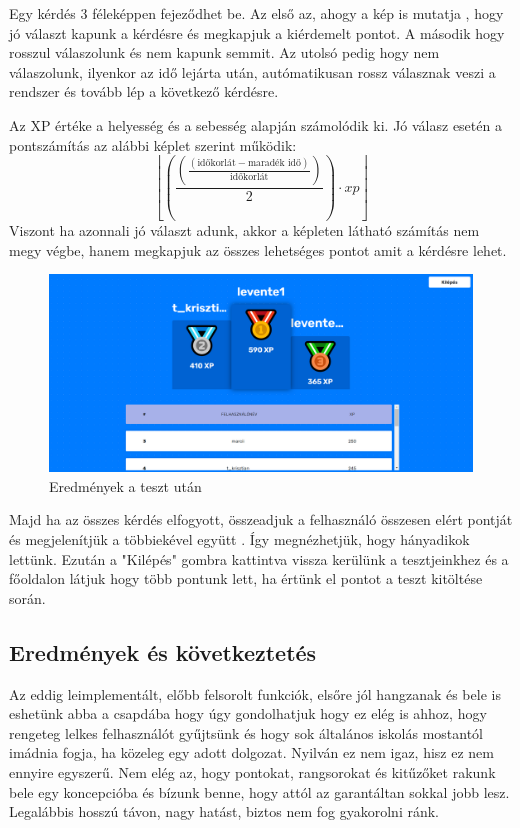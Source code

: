 Egy kérdés 3 féleképpen fejeződhet be. Az első az, ahogy a kép is mutatja , hogy jó választ kapunk a kérdésre és megkapjuk a kiérdemelt pontot. A második hogy rosszul válaszolunk és nem kapunk semmit. Az utolsó pedig hogy nem válaszolunk, ilyenkor az idő lejárta után, autómatikusan rossz válasznak veszi a rendszer és tovább lép a következő kérdésre. \newline

Az XP értéke a helyesség és a sebesség alapján számolódik ki.
Jó válasz esetén a pontszámítás az alábbi képlet szerint működik:
\[ \left\lfloor\left(\frac{\left(\frac{\left( \text{időkorlát} - \text{maradék idő}\right)}{ \text{időkorlát}}\right)}{2}\right)\cdot xp\right\rfloor \]
Viszont ha azonnali jó választ adunk, akkor a képleten látható számítás nem megy végbe, hanem megkapjuk az összes lehetséges pontot amit a kérdésre lehet.


\begin{figure}[H]
    \centering
    \includegraphics[width=\linewidth]{images/results.png}
    \caption{Eredmények a teszt után}
    \label{fig:results}
\end{figure}

Majd ha az összes kérdés elfogyott, összeadjuk a felhasználó összesen elért pontját és megjelenítjük a többiekével együtt . Így megnézhetjük, hogy hányadikok lettünk. Ezután a "Kilépés" gombra kattintva vissza kerülünk a tesztjeinkhez és a főoldalon látjuk hogy több pontunk lett, ha értünk el pontot a teszt kitöltése során. \newline

\subsection{Eredmények és következtetés}

Az eddig leimplementált, előbb felsorolt funkciók, elsőre jól hangzanak és bele is eshetünk abba a csapdába hogy úgy gondolhatjuk hogy ez elég is ahhoz, hogy rengeteg lelkes felhasználót gyűjtsünk és hogy sok általános iskolás mostantól imádnia fogja, ha közeleg egy adott dolgozat. Nyilván ez nem igaz, hisz ez nem ennyire egyszerű. Nem elég az, hogy pontokat, rangsorokat és kitűzőket rakunk bele egy koncepcióba és bízunk benne, hogy attól az garantáltan sokkal jobb lesz. Legalábbis hosszú távon, nagy hatást, biztos nem fog gyakorolni ránk. \newline

